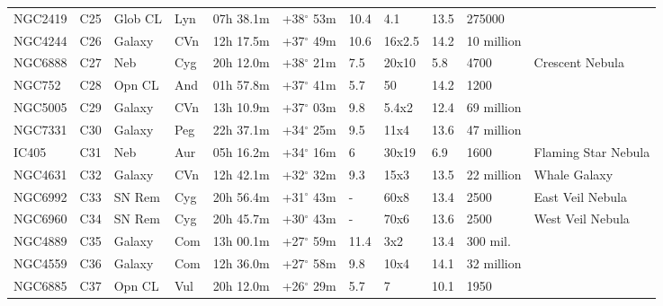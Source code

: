 \documentclass[10pt,twoside,a4paper,english]{article}
\begin{document}
\begin{longtable}{@{}lllllllllll@{}}
NGC2419    & C25           & Glob CL & Lyn & 07h 38.1m & +38$^{\circ}$ 53m & 10.4 & 4.1            & 13.5 & 275000        &                                 \\ 
NGC4244    & C26           & Galaxy  & CVn & 12h 17.5m & +37$^{\circ}$ 49m & 10.6 & 16x2.5         & 14.2 & 10 million    &                                 \\ 
NGC6888    & C27           & Neb     & Cyg & 20h 12.0m & +38$^{\circ}$ 21m & 7.5  & 20x10          & 5.8  & 4700          & Crescent Nebula                 \\ 
NGC752     & C28           & Opn CL  & And & 01h 57.8m & +37$^{\circ}$ 41m & 5.7  & 50             & 14.2 & 1200          &                                 \\ 
NGC5005    & C29           & Galaxy  & CVn & 13h 10.9m & +37$^{\circ}$ 03m & 9.8  & 5.4x2          & 12.4 & 69 million    &                                 \\ 
NGC7331    & C30           & Galaxy  & Peg & 22h 37.1m & +34$^{\circ}$ 25m & 9.5  & 11x4           & 13.6 & 47 million    &                                 \\ 
IC405      & C31           & Neb     & Aur & 05h 16.2m & +34$^{\circ}$ 16m & 6    & 30x19          & 6.9  & 1600          & Flaming Star Nebula             \\ 
NGC4631    & C32           & Galaxy  & CVn & 12h 42.1m & +32$^{\circ}$ 32m & 9.3  & 15x3           & 13.5 & 22 million    & Whale Galaxy                    \\ 
NGC6992    & C33           & SN Rem  & Cyg & 20h 56.4m & +31$^{\circ}$ 43m & -    & 60x8           & 13.4 & 2500          & East Veil Nebula                \\ 
NGC6960    & C34           & SN Rem  & Cyg & 20h 45.7m & +30$^{\circ}$ 43m & -    & 70x6           & 13.6 & 2500          & West Veil Nebula                \\ 
NGC4889    & C35           & Galaxy  & Com & 13h 00.1m & +27$^{\circ}$ 59m & 11.4 & 3x2            & 13.4 & 300 mil.      &                                 \\ 
NGC4559    & C36           & Galaxy  & Com & 12h 36.0m & +27$^{\circ}$ 58m & 9.8  & 10x4           & 14.1 & 32 million    &                                 \\ 
NGC6885    & C37           & Opn CL  & Vul & 20h 12.0m & +26$^{\circ}$ 29m & 5.7  & 7              & 10.1 & 1950          &                                 \\ 

\end{longtable}
\end{document}
